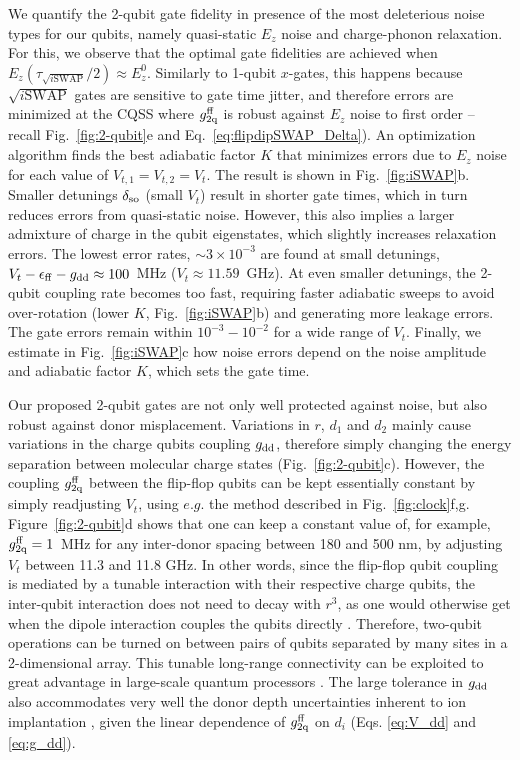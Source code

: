 \documentclass[aps,prb,superscriptaddress,nobibnotes,preprint]{revtex4-1}%
\begin{document}
We quantify the 2-qubit gate fidelity in presence of the most deleterious noise types for our qubits, namely quasi-static $E_z$ noise and charge-phonon relaxation. For this, we observe that the optimal gate fidelities are achieved when $E_z(\tau_{\sqrt{i\mathrm{SWAP}}}/2)\approx E_z^0$. Similarly to 1-qubit $x$-gates, this happens because $\sqrt{i\mathrm{SWAP}}$ gates are sensitive to gate time jitter, and therefore errors are minimized at the CQSS where $g_{\rm 2q}^{\rm ff}$ is robust against $E_z$ noise to first order -- recall Fig.~\ref{fig:2-qubit}e and Eq.~\ref{eq:flipdipSWAP_Delta}). An optimization algorithm finds the best adiabatic factor $K$ that minimizes errors due to $E_z$ noise for each value of $V_{t,1}=V_{t,2}=V_t$. The result is shown in Fig.~\ref{fig:iSWAP}b. Smaller detunings $\delta_{\rm so}$ (small $V_t$) result in shorter gate times, which in turn reduces errors from quasi-static noise. However, this also implies a larger admixture of charge in the qubit eigenstates, which slightly increases relaxation errors. The lowest error rates, $\sim3\times10^{-3}$ are found at small detunings, $V_t-\epsilon_{\rm ff}-g_{\rm dd}\approx 100$~MHz ($V_t\approx11.59$~GHz). At even smaller detunings, the 2-qubit coupling rate becomes too fast, requiring faster adiabatic sweeps to avoid over-rotation (lower $K$, Fig.~\ref{fig:iSWAP}b) and generating more leakage errors. The gate errors remain within $10^{-3}-10^{-2}$ for a wide range of $V_t$. Finally, we estimate in Fig.~\ref{fig:iSWAP}c how noise errors depend on the noise amplitude and adiabatic factor $K$, which sets the gate time.

Our proposed 2-qubit gates are not only well protected against noise, but also robust against donor misplacement. Variations in $r$, $d_1$ and $d_2$ mainly cause variations in the charge qubits coupling $g_{\rm dd}$, therefore simply changing the energy separation between molecular charge states (Fig.~\ref{fig:2-qubit}c). However, the coupling $g_{\rm 2q}^{\rm ff}$ between the flip-flop qubits can be kept essentially constant by simply readjusting $V_t$, using $e.g.$ the method described in Fig.~\ref{fig:clock}f,g. Figure~\ref{fig:2-qubit}d shows that one can keep a constant value of, for example, $g_{\rm 2q}^{\rm ff} = 1$~MHz for any inter-donor spacing between 180 and 500 nm, by adjusting $V_t$ between 11.3 and 11.8 GHz. In other words, since the flip-flop qubit coupling is mediated by a tunable interaction with their respective charge qubits, the inter-qubit interaction does not need to decay with $r^3$, as one would otherwise get when the dipole interaction couples the qubits directly \cite{Ogorman2014,Hill2015}. Therefore, two-qubit operations can be turned on between pairs of qubits separated by many sites in a 2-dimensional array. This tunable long-range connectivity can be exploited to great advantage in large-scale quantum processors \cite{Li2017}. The large tolerance in $g_{\rm dd}$ also accommodates very well the donor depth uncertainties inherent to ion implantation \cite{Donkelaar2015}, given the linear dependence of $g_{\rm 2q}^{\rm ff}$ on $d_i$ (Eqs. \ref{eq:V_dd} and \ref{eq:g_dd}).  
\end{document}
